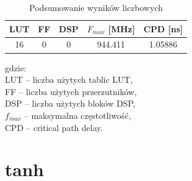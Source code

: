 \documentclass[12pt, a4paper, oneside]{scrreprt}
\begin{document}
\begin{table}[H]
    \centering
    \caption{Podsumowanie wyników liczbowych}
    \label{tab:relu_wyniki}

    \begin{tabular}{ccccc}
        \toprule
        LUT & FF & DSP & $F_{max}$ [MHz] & CPD [ns] \\
        \midrule
        16 & 0 & 0 & 944.411 & 1.05886 \\
        \bottomrule
    \end{tabular}
    \vspace{1.5em}
    \footnotesize
    
    gdzie: \\
    LUT -- liczba użytych tablic LUT, \\
    FF -- liczba użytych przerzutników, \\
    DSP -- liczba użytych bloków DSP, \\
    $f_{max}$ -- maksymalna częstotliwość, \\
    CPD -- critical path delay.
\end{table}

\section{tanh}
\end{document}
